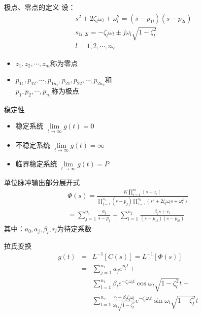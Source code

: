  \begin{frame}
 \begin{block}{极点、零点的定义}
 设：
 \begin{eqnarray*}
 &&s^2+2\zeta_l\omega_l+\omega_l^2=(s-p_{1l})(s-p_{2l})\\
 &&s_{1l,2l}=-\zeta_l\omega_l\pm j\omega_l\sqrt{1-\zeta_l^2}\\
 &&l=1,2,\cdots ,n_2
\end{eqnarray*}
\begin{itemize}
\item $z_1,z_2,\cdots,z_m$称为零点
\item $p_{11},p_{12},\cdots,p_{1n_2},p_{21},p_{22},\cdots,p_{2n_2}$和\\
$p_1,p_2,\cdots,p_{n_1}$称为极点
\end{itemize}  
\end{block}
\end{frame}

\begin{frame}
\begin{block}{稳定性}
\begin{itemize}
\item 稳定系统
$\lim\limits_{t\rightarrow \infty}g(t)=0$
\item 不稳定系统
$\lim\limits_{t\rightarrow \infty}g(t)=\infty$
\item 临界稳定系统
$\lim\limits_{t\rightarrow \infty}g(t)=P$
\end{itemize}
\end{block}
\end{frame}
\begin{frame}
\begin{block}{单位脉冲输出部分展开式}
\begin{eqnarray*}
\Phi(s)=\frac{K\prod\limits_{i=1}^m(s-z_i)}{\prod\limits_{j=1}^{n_1}(s-p_j)\prod\limits_{i=1}^{n_2}(s^2+2\zeta_l\omega_ls+\omega_l^2)}\\
=\sum_{j=1}^{n_1}\frac{a_j}{s-p_j}+\sum_{l=1}^{n_2}\frac{\beta_ls+r_l}{(s-p_{1l})(s-p_{2l})}
\end{eqnarray*}
其中：$a_0,a_j,\beta_l,r_l$为待定系数
\end{block}
\end{frame}

\begin{frame}
\begin{block}{拉氏变换}
\begin{eqnarray*}
g(t)&=&L^{-1}[C(s)]=L^{-1}[\Phi(s)]\\
&=&\sum_{j=1}^{n_1}a_je^{p_jt}+\\
&&\sum_{l=1}^{n_1}\beta_le^{-\zeta_l\omega_lt}\cos\omega_l\sqrt{1-\zeta^2_l}t+\\
&&\sum_{l=1}^{n_2}\frac{r_l-\beta_l\zeta_l\omega_l}{\omega_l\sqrt{1-\zeta_l^2}}e^{-\zeta_l\omega_lt}\sin\omega_l\sqrt{1-\zeta_l^2}t
\end{eqnarray*}
\end{block}
\end{frame}


